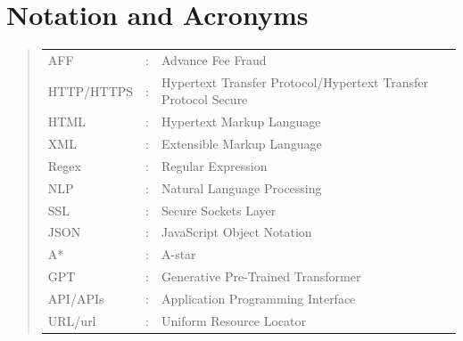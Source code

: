 \documentclass[ oneside,%
                    author={Cassie Qing Tang},
                    degree={BSc},
                     title={An Automated Response System for Disrupting Online Pet Scamming \\ },
                    subtitle={ }]{dissertation}
\begin{document}
\chapter*{Notation and Acronyms}
\begin{quote}
\noindent
\begin{tabular}{lcl}
AFF                 &:     & Advance Fee Fraud    
 \\ 
HTTP/HTTPS          &:     & Hypertext Transfer Protocol/Hypertext Transfer Protocol Secure
 \\ 
HTML                &:     & Hypertext Markup Language
\\
XML                 &:     & Extensible Markup Language
\\
Regex               &:     & Regular Expression
\\
NLP                 &:     & Natural Language Processing
\\
SSL                 &:     & Secure Sockets Layer
\\
JSON                &:     & JavaScript Object Notation
\\
A*                  &:     & A-star
\\
GPT                 &:     & Generative Pre-Trained Transformer
\\
API/APIs            &:     & Application Programming Interface
\\
URL/url             &:     & Uniform Resource Locator


\end{tabular}
\end{quote}


\mainmatter
\end{document}
